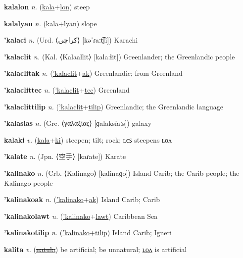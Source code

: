 \textbf{\hypertarget{kalalon}{kalalon}} \textit{n.} (\hyperlink{kala}{kala}+\allowbreak \hyperlink{lon}{lon})
steep

\textbf{\hypertarget{kalalyan}{kalalyan}} \textit{n.} (\hyperlink{kala}{kala}+\allowbreak \hyperlink{lyan}{lyan})
slope

\textbf{\hypertarget{'kalaci}{'kalaci}} \textit{n.} (Urd. ⟨{\arabics{}کراچی‎}⟩ [kəˈɾaːt͡ʃi])
Karachi

\textbf{\hypertarget{'kalaclit}{'kalaclit}} \textit{n.} (Kal. ⟨Kalaallit⟩ [kalaːɬit])
Greenlander; the Greenlandic people

\textbf{\hypertarget{'kalaclitak}{'kalaclitak}} \textit{n.} (\hyperlink{'kalaclit}{'kalaclit}+\allowbreak \hyperlink{ak}{ak})
Greenlandic; from Greenland

\textbf{\hypertarget{'kalaclittec}{'kalaclittec}} \textit{n.} (\hyperlink{'kalaclit}{'kalaclit}+\allowbreak \hyperlink{tec}{tec})
Greenland

\textbf{\hypertarget{'kalaclittilip}{'kalaclittilip}} \textit{n.} (\hyperlink{'kalaclit}{'kalaclit}+\allowbreak \hyperlink{tilip}{tilip})
Greenlandic; the Greenlandic language

\textbf{\hypertarget{'kalasias}{'kalasias}} \textit{n.} (Gre. ⟨γαλαξίας⟩ [ɡalaksíaːs])
galaxy

\textbf{\hypertarget{kalaki}{kalaki}} \textit{v.} (\hyperlink{kala}{kala}+\allowbreak \hyperlink{ki}{ki})
steepen; tilt; rock; ʟєꜱ steepens ʟᴏᴧ

\textbf{\hypertarget{'kalate}{'kalate}} \textit{n.} (Jpn. ⟨{\japanese{}空手}⟩ [kaɾate])
Karate

\textbf{\hypertarget{'kalinako}{'kalinako}} \textit{n.} (Crb. ⟨Kalinago⟩ [kalinaɡo])
Island Carib; the Carib people; the Kalinago people

\textbf{\hypertarget{'kalinakoak}{'kalinakoak}} \textit{n.} (\hyperlink{'kalinako}{'kalinako}+\allowbreak \hyperlink{ak}{ak})
Island Carib; Carib

\textbf{\hypertarget{'kalinakolawt}{'kalinakolawt}} \textit{n.} (\hyperlink{'kalinako}{'kalinako}+\allowbreak \hyperlink{lawt}{lawt})
Caribbean Sea

\textbf{\hypertarget{'kalinakotilip}{'kalinakotilip}} \textit{n.} (\hyperlink{'kalinako}{'kalinako}+\allowbreak \hyperlink{tilip}{tilip})
Island Carib; Igneri

\textbf{\hypertarget{kalita}{kalita}} \textit{v.} (\hyperlink{natula}{\sout{natula}})
be artificial; be unnatural; \hyperlink{kalitalon}{ʟᴏᴧ} is artificial

